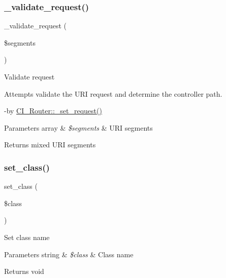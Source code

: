 \subsubsection{\texorpdfstring{\+\_\+validate\+\_\+request()}{\_validate\_request()}}
{\footnotesize\ttfamily \+\_\+validate\+\_\+request (\begin{DoxyParamCaption}\item[{}]{\$segments }\end{DoxyParamCaption})\hspace{0.3cm}{\ttfamily [protected]}}

Validate request

Attempts validate the U\+RI request and determine the controller path.

-\/by \mbox{\hyperlink{class_c_i___router_a92b8b486926e4dea5fee4d71f80a472a}{C\+I\+\_\+\+Router\+::\+\_\+set\+\_\+request()}} 
\begin{DoxyParams}[1]{Parameters}
array & {\em \$segments} & U\+RI segments \\
\hline
\end{DoxyParams}
\begin{DoxyReturn}{Returns}
mixed U\+RI segments 
\end{DoxyReturn}
\mbox{\label{class_c_i___router_afbb540df5c161fe69909a5f8182f910f}} 
\subsubsection{\texorpdfstring{set\+\_\+class()}{set\_class()}}
{\footnotesize\ttfamily set\+\_\+class (\begin{DoxyParamCaption}\item[{}]{\$class }\end{DoxyParamCaption})}

Set class name


\begin{DoxyParams}[1]{Parameters}
string & {\em \$class} & Class name \\
\hline
\end{DoxyParams}
\begin{DoxyReturn}{Returns}
void 
\end{DoxyReturn}
\mbox{\label{class_c_i___router_a80573f758526ffa1beba61be5d45baff}} 
